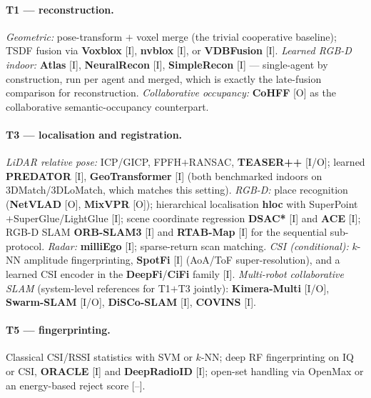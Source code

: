 \paragraph{T1 --- reconstruction.}
\emph{Geometric:} pose-transform ${+}$ voxel merge (the trivial cooperative
baseline); TSDF fusion via \textbf{Voxblox} \cite{voxblox} [I],
\textbf{nvblox} \cite{nvblox} [I], or \textbf{VDBFusion} \cite{vdbfusion} [I].
\emph{Learned RGB-D indoor:} \textbf{Atlas} \cite{atlas} [I],
\textbf{NeuralRecon} \cite{neuralrecon} [I], \textbf{SimpleRecon}
\cite{simplerecon} [I] --- single-agent by construction, run per agent and
merged, which is exactly the late-fusion comparison for reconstruction.
\emph{Collaborative occupancy:} \textbf{CoHFF} \cite{cohff} [O] as the
collaborative semantic-occupancy counterpart.

\paragraph{T3 --- localisation and registration.}
\emph{LiDAR relative pose:} ICP/GICP, FPFH${+}$RANSAC, \textbf{TEASER++}
\cite{teaser} [I/O]; learned \textbf{PREDATOR} \cite{predator} [I],
\textbf{GeoTransformer} \cite{geotransformer} [I] (both benchmarked indoors on
3DMatch/3DLoMatch, which matches this setting).
\emph{RGB-D:} place recognition (\textbf{NetVLAD} \cite{netvlad} [O],
\textbf{MixVPR} \cite{mixvpr} [O]); hierarchical localisation \textbf{hloc}
with SuperPoint${+}$SuperGlue/LightGlue \cite{hloc,superglue} [I]; scene
coordinate regression \textbf{DSAC*} \cite{dsacstar} [I] and \textbf{ACE}
\cite{ace} [I]; RGB-D SLAM \textbf{ORB-SLAM3} \cite{orbslam3} [I] and
\textbf{RTAB-Map} \cite{rtabmap} [I] for the sequential sub-protocol.
\emph{Radar:} \textbf{milliEgo} \cite{milliego} [I]; sparse-return scan
matching.
\emph{CSI (conditional):} $k$-NN amplitude fingerprinting,
\textbf{SpotFi} \cite{spotfi} [I] (AoA/ToF super-resolution), and a learned CSI
encoder in the \textbf{DeepFi}/\textbf{CiFi} family \cite{deepfi} [I].
\emph{Multi-robot collaborative SLAM} (system-level references for T1${+}$T3
jointly): \textbf{Kimera-Multi} \cite{kimeramulti} [I/O],
\textbf{Swarm-SLAM} \cite{swarmslam} [I/O], \textbf{DiSCo-SLAM}
\cite{discoslam} [I], \textbf{COVINS} \cite{covins} [I].

\paragraph{T5 --- fingerprinting.}
Classical CSI/RSSI statistics with SVM or $k$-NN; deep RF fingerprinting on IQ
or CSI, \textbf{ORACLE} \cite{oracle} [I] and \textbf{DeepRadioID}
\cite{deepradioid} [I]; open-set handling via OpenMax or an energy-based reject
score \cite{openmax} [--].

